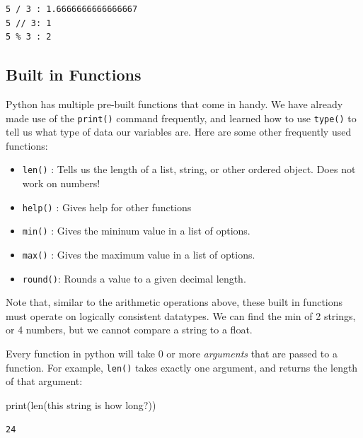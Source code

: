 \documentclass[
  letterpaper,
  DIV=11,
  numbers=noendperiod]{scrreprt}
\newenvironment{Shaded}{\begin{snugshade}}{\end{snugshade}}
\newcommand{\BuiltInTok}[1]{\textcolor[rgb]{0.00,0.23,0.31}{#1}}
\newcommand{\NormalTok}[1]{\textcolor[rgb]{0.00,0.23,0.31}{#1}}
\newcommand{\StringTok}[1]{\textcolor[rgb]{0.13,0.47,0.30}{#1}}
\providecommand{\tightlist}{%
  \setlength{\itemsep}{0pt}\setlength{\parskip}{0pt}}\usepackage{longtable,booktabs,array}
\begin{document}
\begin{verbatim}
5 / 3 : 1.6666666666666667
5 // 3: 1
5 % 3 : 2
\end{verbatim}

\hypertarget{built-in-functions}{%
\subsection{Built in Functions}\label{built-in-functions}}

Python has multiple pre-built functions that come in handy. We have
already made use of the \texttt{print()} command frequently, and learned
how to use \texttt{type()} to tell us what type of data our variables
are. Here are some other frequently used functions:

\begin{itemize}
\tightlist
\item
  \texttt{len()} : Tells us the length of a list, string, or other
  ordered object. Does not work on numbers!
\item
  \texttt{help()} : Gives help for other functions
\item
  \texttt{min()} : Gives the mininum value in a list of options.
\item
  \texttt{max()} : Gives the maximum value in a list of options.
\item
  \texttt{round()}: Rounds a value to a given decimal length.
\end{itemize}

Note that, similar to the arithmetic operations above, these built in
functions must operate on logically consistent datatypes. We can find
the min of 2 strings, or 4 numbers, but we cannot compare a string to a
float.

Every function in python will take 0 or more \emph{arguments} that are
passed to a function. For example, \texttt{len()} takes exactly one
argument, and returns the length of that argument:

\begin{Shaded}
\begin{Highlighting}[]
 \BuiltInTok{print}\NormalTok{(}\BuiltInTok{len}\NormalTok{(}\StringTok{\textquotesingle{}this string is how long?\textquotesingle{}}\NormalTok{))}
\end{Highlighting}
\end{Shaded}

\begin{verbatim}
24
\end{verbatim}
\end{document}
